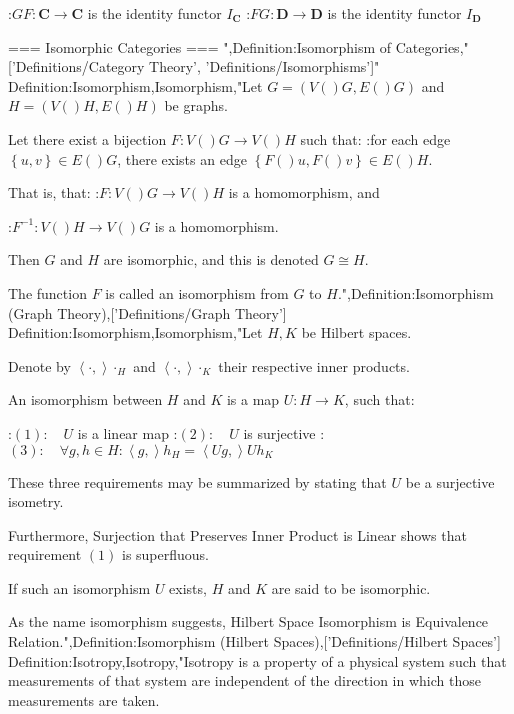 :$G F: \mathbf C \to \mathbf C$ is the identity functor $I_{\mathbf C}$
:$F G: \mathbf D \to \mathbf D$ is the identity functor $I_{\mathbf D}$


=== Isomorphic Categories ===
",Definition:Isomorphism of Categories,"['Definitions/Category Theory', 'Definitions/Isomorphisms']"
Definition:Isomorphism,Isomorphism,"Let $G = \left( V \left(   \right)G, E \left(   \right)G \right)$ and $H = \left( V \left(   \right)H, E \left(   \right)H \right)$ be graphs.

Let there exist a bijection $F: V \left(   \right)G \to V \left(   \right)H$ such that:
:for each edge $\left\lbrace u, v \right\rbrace \in E \left(   \right)G$, there exists an edge $\left\lbrace F \left(   \right)u, F \left(   \right)v \right\rbrace \in E \left(   \right)H$.


That is, that:
:$F: V \left(   \right)G \to V \left(   \right)H$ is a homomorphism, and

:$F^{-1}: V \left(   \right)H \to V \left(   \right)G$ is a homomorphism.


Then $G$ and $H$ are isomorphic, and this is denoted $G \cong H$.

The function $F$ is called an isomorphism from $G$ to $H$.",Definition:Isomorphism (Graph Theory),['Definitions/Graph Theory']
Definition:Isomorphism,Isomorphism,"Let $H, K$ be Hilbert spaces.

Denote by $\left\langle \cdot,   \right\rangle\cdot_H$ and $\left\langle \cdot,   \right\rangle\cdot_K$ their respective inner products.

An isomorphism between $H$ and $K$ is a map $U: H \to K$, such that:

:$(1): \quad U$ is a linear map
:$(2): \quad U$ is surjective
:$(3): \quad \forall g, h \in H: \left\langle g,   \right\rangle h_H = \left\langle U g,   \right\rangle{U h}_K$

These three requirements may be summarized by stating that $U$ be a surjective isometry.

Furthermore, Surjection that Preserves Inner Product is Linear shows that requirement $(1)$ is superfluous.


If such an isomorphism $U$ exists, $H$ and $K$ are said to be isomorphic.


As the name isomorphism suggests, Hilbert Space Isomorphism is Equivalence Relation.",Definition:Isomorphism (Hilbert Spaces),['Definitions/Hilbert Spaces']
Definition:Isotropy,Isotropy,"Isotropy is a property of a physical system such that measurements of that system are independent of the direction in which those measurements are taken.

